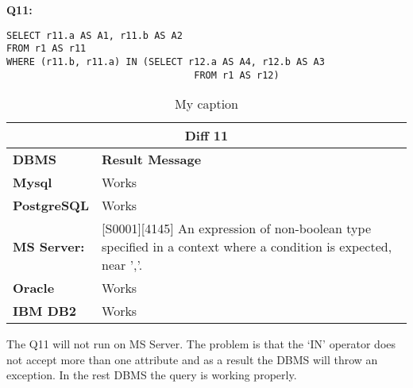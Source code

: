 \begin{mdframed}[backgroundcolor=lightgray!20] 
\textbf{Q11:}
\begin{lstlisting}
SELECT r11.a AS A1, r11.b AS A2
FROM r1 AS r11
WHERE (r11.b, r11.a) IN (SELECT r12.a AS A4, r12.b AS A3
                         		 FROM r1 AS r12)  
\end{lstlisting}
\end{mdframed}



\begin{table}[]
\centering
\caption{My caption}
\label{my-label}
\begin{tabular}{|p{2cm}|p{12cm}|}
\hline
\multicolumn{2}{|c|}{\textbf{Diff 11}}                                                                                                                                                      \\ \hline
\textbf{DBMS}                              & \textbf{Result Message}                                                                                                                        \\ \hline
{\color[HTML]{333333} \textbf{Mysql}}      & {\color[HTML]{333333} Works}                                                                                                                   \\ \hline
{\color[HTML]{333333} \textbf{PostgreSQL}} & {\color[HTML]{333333} Works}                                                                                                                   \\ \hline
{\color[HTML]{333333} \textbf{MS Server:}} & {\color[HTML]{333333} {[}S0001{]}{[}4145{]} An expression of non-boolean type specified in a context where a condition is expected, near ','.} \\ \hline
\textbf{Oracle}                            & Works                                                                                                                                          \\ \hline
\textbf{IBM DB2}                           & Works                                                                                                                                          \\ \hline
\end{tabular}
\end{table}

The Q11 will not run on MS Server. The problem is that the ‘IN’ operator does not accept more than one attribute and as a result the DBMS will throw an exception. In the rest DBMS the query is working properly. 

